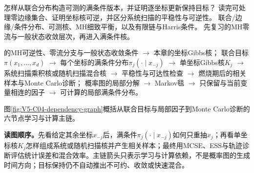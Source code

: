 \documentclass[UTF8,a4paper,11pt,openany]{ctexbook}
\begin{document}
\setcounter{page}{629}
\setcounter{chapter}{33}
\setcounter{figure}{0}
\pagestyle{headings}
{怎样从联合分布构造可测的满条件版本，并证明逐坐标更新保持目标？}
{读完可处理零边缘集合、证明坐标核可逆，并区分系统扫描的平稳性与可逆性。}
{联合/边缘/条件分布、可测核、MH细致平衡，以及有限链与Harris条件。}
{先复习的MH零流与一般状态收敛层次，再进入满条件核。}
\begin{dependencybox}
的MH可逆性、零流分支与一般状态收敛条件 $\to$ 本章的坐标Gibbs核；
联合目标$\pi(x_1,\ldots,x_d)$
$\to$ 每个坐标的满条件分布$\pi_j(\cdot\mid x_{-j})$
$\to$ 单坐标Gibbs核$K_j$
$\to$ 系统扫描乘积核或随机扫描混合核
$\to$ 平稳性与可达性检查
$\to$ 燃烧期后的相关样本与Monte Carlo诊断；
概率图的局部分解
$\to$ Markov毯
$\to$ 只保留与当前变量相连的因子
$\to$ 可计算的局部满条件分布。
\end{dependencybox}
图\ref{fig:V5-C04-dependency-graph}概括从联合目标与局部因子到Monte Carlo诊断的六节点学习与计算主链。

\FloatBarrier
\noindent\textbf{读图顺序。}先看给定其余坐标$x_{-j}$后，满条件$\pi_j(\cdot\mid x_{-j})$如何只重抽$x_j$；再看单坐标核$K_j$怎样组成系统或随机扫描核并产生相关样本；最终用MCSE、ESS与轨迹诊断评估统计误差和混合效率。主链箭头只表示学习与计算依赖，不是概率图的生成时间方向；目标保持仍不自动推出不可约、收敛或快速混合。\par
\end{document}

